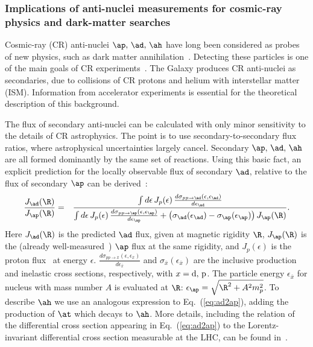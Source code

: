 \subsubsection{Implications of anti-nuclei measurements for cosmic-ray physics and dark-matter searches}

Cosmic-ray (CR) anti-nuclei $\ap,\,\ad,\,\ah$ have long been considered as probes of new physics, such as dark matter annihilation~\cite{Donato:1999gy, Baer:2005tw, Donato:2008yx, Brauninger:2009pe, Kadastik:2009ts, Cui:2010ud, Dal:2012my, Ibarra:2012cc, Fornengo:2013osa, Carlson:2014ssa, Aramaki:2015pii,Korsmeier:2017xzj}. Detecting these particles is one of the main goals of CR experiments~\cite{Giovacchini:2007dwa,kounineHebar,vonDoetinchem:2015zva,Aramaki:2015laa,Abe:2011nx}. The Galaxy produces CR anti-nuclei as secondaries, due to collisions of CR protons and helium with  interstellar matter (ISM). Information from accelerator experiments is essential for the theoretical description of this background.

The flux of secondary anti-nuclei can be calculated with only minor sensitivity to the details of CR astrophysics. The point is to use secondary-to-secondary flux ratios, where astrophysical uncertainties largely cancel. 
%
Secondary $\ap,\,\ad,\,\ah$ are all formed dominantly by the same set of reactions. 
%
Using this basic fact, an explicit prediction for the locally observable flux of secondary $\ad$, relative to the  flux of secondary $\ap$ can be derived~\cite{Ginzburg:1990sk,Katz:2009yd,Blum:2017qnn}:
%
\begin{eqnarray}
\label{eq:ad2ap}\frac{J_{\ad}(\R)}{J_{\ap}(\R)}&=&\frac{\int d\epsilon\,J_p(\epsilon)\,\frac{d\sigma_{pp\to\ad}(\epsilon,\epsilon_{\ad})}{d\epsilon_{\ad}}}{\int d\epsilon\,J_p(\epsilon)\,\frac{d\sigma_{pp\to\ap}(\epsilon,\epsilon_{\ap})}{d\epsilon_{\ap}}+\left(\sigma_{\ad}(\epsilon_{\ad})-\sigma_{\ap}(\epsilon_{\ap})\right)J_{\ap}(\R)}.
\end{eqnarray}
%
%
\noindent
Here $J_{\ad}(\R)$ is the predicted $\ad$ flux, given at magnetic rigidity $\R$, $J_{\ap}(\R)$ is the (already well-measured~\cite{Aguilar:2016kjl}) $\ap$ flux at the same rigidity, and  
%
$J_p(\epsilon)$ is the proton flux~\cite{Aguilar:2015ooa} at energy $\epsilon$. 
%
$\frac{d\sigma_{pp\to\bar x}(\epsilon,\epsilon_{\bar x})}{d\epsilon_{\bar x}}$ and $\sigma_{\bar x}(\epsilon_{\bar x})$ are the inclusive production and inelastic cross sections, respectively, with $x={\rm d},\,{\rm p}$. 
The particle energy $\epsilon_{\bar x}$ for nucleus with mass number $A$ is evaluated at $\R$:
$\epsilon_{\ap}=\sqrt{\R^2+A^2m_p^2}$. 
%
To describe $\ah$ we use an analogous expression to Eq.~(\ref{eq:ad2ap}), adding the production of $\at$ which decays to $\ah$. More details, including the relation of the differential cross section appearing in Eq.~(\ref{eq:ad2ap}) to the Lorentz-invariant differential cross section measurable at the LHC, can be found in~\cite{Blum:2017qnn}.

